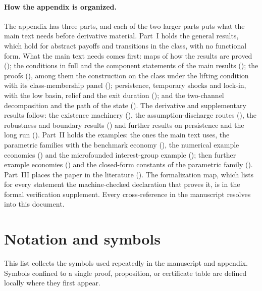\paragraph{How the appendix is organized.} The appendix has three parts, and each of
the two larger parts puts what the main text needs before derivative material.
Part~I holds the general results, which hold for abstract payoffs and transitions in the
class, with no functional form. What the main text needs comes first: maps of how the
results are proved (); the conditions in
full and the component statements of the main results
(); the proofs (), among them the
construction on the class under the lifting condition with its class-membership panel
(); persistence, temporary shocks and lock-in, with the low
basin, relief and the exit duration (); and the two-channel
decomposition and the path of the state (). The derivative
and supplementary results follow: the existence machinery (),
the assumption-discharge routes (), the robustness and boundary
results () and further results on persistence and the long
run (). Part~II holds the examples: the ones the main text uses, the
parametric families with the benchmark economy (), the numerical
example economies () and the microfounded interest-group
example (); then further example economies
() and the closed-form constants of the parametric family
(). Part~III places the paper in the literature
(). The formalization map, which lists for every statement the
machine-checked declaration that proves it, is in the formal verification supplement.
Every cross-reference in the manuscript resolves into this document.

\section*{Notation and symbols}

This list collects the symbols used repeatedly in the manuscript and
appendix. Symbols confined to a single proof, proposition, or certificate
table are defined locally where they first appear.

